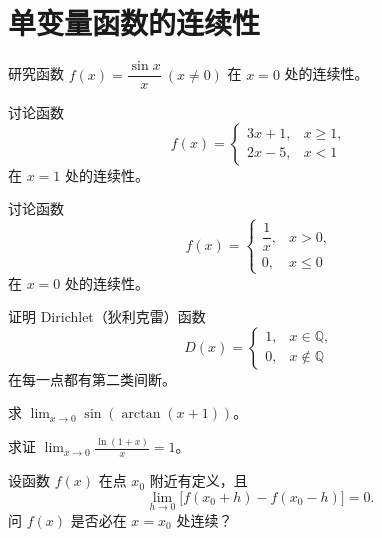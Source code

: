\renewcommand{\thesection}{\arabic{section}}\renewcommand{\theHsection}{chapter.\arabic{section}}\setcounter{section}{1}\section{单变量函数的连续性}
\noindent\begin{minipage}{\textwidth}
研究函数 $f(x)=\dfrac{\sin x}{x}\ (x\ne0)$ 在 $x=0$ 处的连续性。
\end{minipage}\par\vfill
\noindent\begin{minipage}{\textwidth}
讨论函数\[f(x)=\begin{cases}3x+1,&x\ge1,\\2x-5,&x<1\end{cases}\]在 $x=1$ 处的连续性。
\end{minipage}\par\vfill
\noindent\begin{minipage}{\textwidth}
讨论函数\[f(x)=\begin{cases}\dfrac1x,&x>0,\\0,&x\le0\end{cases}\]在 $x=0$ 处的连续性。
\end{minipage}\par\vfill
\noindent\begin{minipage}{\textwidth}
证明 Dirichlet（狄利克雷）函数\[D(x)=\begin{cases}1,&x\in\mathbb Q,\\0,&x\notin\mathbb Q\end{cases}\]在每一点都有第二类间断。
\end{minipage}\par\vfill
\newpage
\noindent\begin{minipage}{\textwidth}
求 $\displaystyle\lim_{x\to0}\sin(\arctan(x+1))$。
\end{minipage}\par\vfill
\noindent\begin{minipage}{\textwidth}
求证 $\displaystyle\lim_{x\to0}\frac{\ln(1+x)}x=1$。
\end{minipage}\par\vfill
\noindent\begin{minipage}{\textwidth}
设函数 $f(x)$ 在点 $x_0$ 附近有定义，且\[\lim_{h\to0}\bigl[f(x_0+h)-f(x_0-h)\bigr]=0.\]问 $f(x)$ 是否必在 $x=x_0$ 处连续？
\end{minipage}\par\vfill
